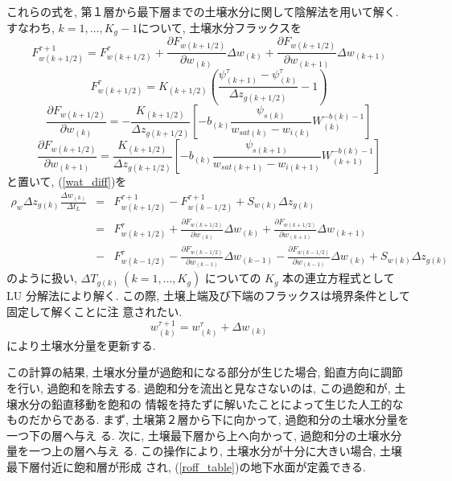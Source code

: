 これらの式を, 第１層から最下層までの土壌水分に関して陰解法を用いて解く. 
すなわち, $k=1,\ldots,K_g-1$について, 土壌水分フラックスを
\begin{equation}
  F_{w(k+1/2)}^{\tau+1} = F_{w(k+1/2)}^{\tau}
+\frac{\partial {F}_{w(k+1/2)}}{\partial w_{(k)}} 
 \Delta w_{(k)}
+\frac{\partial {F}_{w(k+1/2)}}{\partial w_{(k+1)}} 
 \Delta w_{(k+1)}
\end{equation}
\begin{equation}
  F_{w(k+1/2)}^{\tau} =
K_{(k+1/2)} \left(\frac{\psi_{(k+1)}^{\tau} - \psi_{(k)}^{\tau}}{\Delta z_{g(k+1/2)}} - 1 \right)
\end{equation}
\begin{equation}
 \frac{\partial {F}_{w(k+1/2)}}{\partial w_{(k)}} = 
- \frac{K_{(k+1/2)}}{\Delta z_{g(k+1/2)}} 
\left[
-b_{(k)} \frac{\psi_{s(k)}}{w_{sat(k)}-w_{i(k)}}W_{(k)}^{-b(k)-1}
\right]
\end{equation}
\begin{equation}
 \frac{\partial {F}_{w(k+1/2)}}{\partial w_{(k+1)}} = 
 \frac{K_{(k+1/2)}}{\Delta z_{g(k+1/2)}} 
\left[
-b_{(k)} \frac{\psi_{s(k+1)}}{w_{sat(k+1)}-w_{i(k+1)}}W_{(k+1)}^{-b(k)-1}
\right]
\end{equation}
と置いて, (\ref{wat_diff})を
\begin{eqnarray}
\rho_w \Delta z_{g(k)} \frac{\Delta w_{(k)}}{\Delta t_L} 
&=& F_{w(k+1/2)}^{\tau+1} - {F}_{w(k-1/2)}^{\tau+1} + S_{w(k)} \Delta z_{g(k)} \nonumber \\
&=& {F}_{w(k+1/2)}^{\tau} 
+\frac{\partial F_{w(k+1/2)}}{\partial w_{(k)}} 
 \Delta w_{(k)}
+\frac{\partial F_{w(k+1/2)}}{\partial w_{(k+1)}} 
 \Delta w_{(k+1)} \nonumber \\
&-& F_{w(k-1/2)}^{\tau}
-\frac{\partial F_{w(k-1/2)}}{\partial w_{(k-1)}} 
 \Delta w_{(k-1)}
-\frac{\partial F_{w(k-1/2)}}{\partial w_{(k-1)}} 
 \Delta w_{(k)} + S_{w(k)} \Delta z_{g(k)} 
\end{eqnarray}
のように扱い, $\Delta T_{g(k)}\ (k=1,\ldots,K_{g})$ についての
$K_{g}$ 本の連立方程式として LU 分解法により解く. 
この際, 土壌上端及び下端のフラックスは境界条件として固定して解くことに注
意されたい. 
\begin{equation}
 w_{(k)}^{\tau+1} = w_{(k)}^{\tau} + \Delta w_{(k)}
\end{equation}
により土壌水分量を更新する. 

この計算の結果, 土壌水分量が過飽和になる部分が生じた場合, 鉛直方向に調節
を行い, 過飽和を除去する. 
過飽和分を流出と見なさないのは, この過飽和が, 土壌水分の鉛直移動を飽和の
情報を持たずに解いたことによって生じた人工的なものだからである. 
まず, 土壌第２層から下に向かって, 過飽和分の土壌水分量を一つ下の層へ与え
る. 
次に, 土壌最下層から上へ向かって, 過飽和分の土壌水分量を一つ上の層へ与え
る. 
この操作により, 土壌水分が十分に大きい場合, 土壌最下層付近に飽和層が形成
され, (\ref{roff_table})の地下水面が定義できる. 

